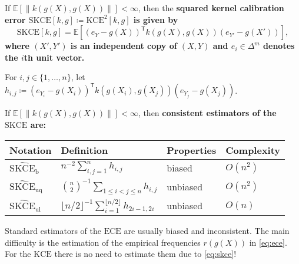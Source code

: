\documentclass[10pt]{article}
\newcommand{\hl}[1]{\begingroup\bfseries\boldmath\color{uured}#1\endgroup}
\newcommand*{\Expect}{\mathbb{E}}
\newcommand*{\transpose}[1]{{#1}^{\mathsf{T}}}
\newcommand*{\ECE}{\mathup{ECE}}
\newcommand*{\kernelmeasure}{\mathup{KCE}}
\newcommand*{\squaredkernelmeasure}{\mathup{SKCE}}
\newcommand*{\biasedestimator}{\widehat{\mathup{SKCE}}_{\mathup{b}}}
\newcommand*{\unbiasedestimator}{\widehat{\mathup{SKCE}}_{\mathup{uq}}}
\newcommand*{\linearestimator}{\widehat{\mathup{SKCE}}_{\mathup{ul}}}
\begin{document}
\begin{tcbposter}
{    \begin{tcolorbox}[colback=blondstark]
      If $\Expect[\|k(g(X), g(X))\|] < \infty$, then the \hl{squared kernel
      calibration error}
      $\squaredkernelmeasure[k, g] \coloneqq \kernelmeasure^2[k,g]$ is
      given by
      \begin{equation}\label{eq:skce}
        \squaredkernelmeasure[k, g] = \Expect\left[\transpose{(e_Y - g(X))} k(g(X), g(X)) {(e_{Y'} - g(X'))} \right],
      \end{equation}
      where $(X', Y')$ is an independent copy of $(X, Y)$ and
      $e_i \in \Delta^m$ denotes the $i$th unit vector.
    \end{tcolorbox}

    For $i,j \in \{1,\ldots,n\}$, let
    $h_{i,j} \coloneqq \transpose{(e_{Y_i} - g(X_i))} k(g(X_i), g(X_j)) (e_{Y_j} - g(X_j))$.

    \begin{tcolorbox}[colback=blondstark]
      If $\Expect[\|k(g(X),g(X))\|] < \infty$, then \hl{consistent estimators}
      of the $\squaredkernelmeasure$ are:
      \begin{center}
        \begin{tabular}{llll} \toprule
          Notation & Definition & Properties & Complexity\\ \midrule
          $\biasedestimator$ & $n^{-2} \sum_{i,j=1}^n h_{i,j}$ & biased & $O(n^2)$ \\
          $\unbiasedestimator$ & $ {\binom{n}{2}}^{-1} \sum_{1 \leq i < j \leq n} h_{i,j}$ & unbiased & $O(n^2)$ \\
          $\linearestimator$ & $ {\lfloor n/2\rfloor}^{-1} \sum_{i = 1}^{\lfloor n / 2\rfloor} h_{2i-1,2i}$ & unbiased & $O(n)$ \\ \bottomrule
        \end{tabular}
      \end{center}
    \end{tcolorbox}


    Standard estimators of the $\ECE$ are usually biased and inconsistent.
    The main difficulty is the estimation of the empirical frequencies
    $r(g(X))$ in \cref{eq:ece}. For the $\kernelmeasure$ there is no need
    to estimate them due to \cref{eq:skce}!
  }

\end{tcbposter}
\end{document}
